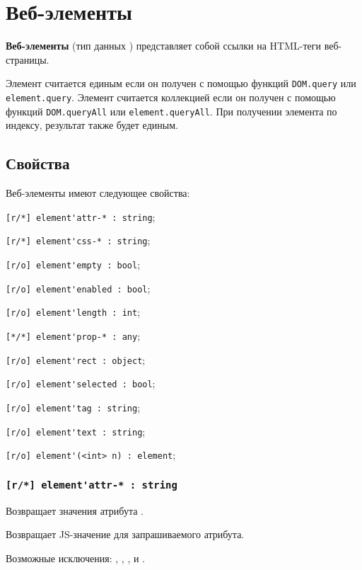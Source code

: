 \section{Веб-элементы}
\label{webelments}

{\bf Веб-элементы} (тип данных \element) представляет собой ссылки на HTML-теги веб-страницы.

Элемент считается единым если он получен с помощью функций \lstinline|DOM.query| или \lstinline|element.query|. Элемент считается коллекцией если он получен с помощью функций \lstinline|DOM.queryAll| или \lstinline|element.queryAll|. При получении элемента по индексу, результат также будет единым.

\subsection{Свойства}

Веб-элементы имеют следующее свойства:
\begin{icItems}
\item \lstinline|[r/*] element'attr-* : string|;
\item \lstinline|[r/*] element'css-* : string|;
\item \lstinline|[r/o] element'empty : bool|;
\item \lstinline|[r/o] element'enabled : bool|;
\item \lstinline|[r/o] element'length : int|;
\item \lstinline|[*/*] element'prop-* : any|;
\item \lstinline|[r/o] element'rect : object|;
\item \lstinline|[r/o] element'selected : bool|;
\item \lstinline|[r/o] element'tag : string|;
\item \lstinline|[r/o] element'text : string|;
\item \lstinline|[r/o] element'(<int> n) : element|;
\end{icItems} 

\subsubsection{\lstinline|[r/*] element'attr-* : string|}

\code{[w3c]} Возвращает значения атрибута \code{*}.

\code{[icL]} Возвращает JS-значение для запрашиваемого атрибута.

Возможные исключения: , , ,  и .

